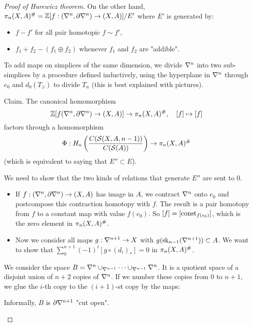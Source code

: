 \begin{proof}[Proof of Hurewicz theorem]
On the other hand, $\pi_n(X,A)^\#={\mathbb Z}[f:(\nabla^n,\partial\nabla^n)\to(X,A)]/E'$
where $E'$ is generated by:
\begin{itemize}[label={-}]
    \item $f-f'$ for all pair homotopic $f\sim f'$,
    \item $f_1+f_2-(f_1\oplus f_2)$ whenever $f_1$ and $f_2$ are "addible".
\end{itemize}

To add maps on simplices of the same dimension, we divide $\nabla^n$ into two sub-simplices by a procedure defined inductively, using the hyperplane in $\nabla^n$ through $e_0$ and $d_0(T_\ni)$ to divide $T_n$ (this is best explained with pictures).\alvaropls

Claim. The canonical homomorphism
\[{\mathbb Z}[f(\nabla^n,\partial\nabla^n)\to(X,A)]\to \pi_n(X,A)^\#,\quad [f]\mapsto[f]\]
factors through a homomorphism
\[\Phi: H_n\left(\frac{C(\mathcal{S}(X,A,n-1))}{C(\mathcal{S}(A))}\right)\to\pi_n(X,A)^\#\]
(which is equivalent to saying that $E''\subset E$).

\begin{claimproof}
We need to show that the two kinds of relations that generate $E''$ are sent to $0$.
\begin{itemize}[label={-}]
    \item If $f:(\nabla^n,\partial\nabla^n)\to(X,A)$ has image in $A$, we contract $\nabla^n$ onto $e_0$ and postcompose this contraction homotopy with $f$. The result is a pair homotopy from $f$ to a constant map with value $f(e_0)$. So $[f]=[\operatorname{const}_{f(e_0)}]$, which is the zero element in $\pi_n(X,A)^\#$.
    \item Now we consider all maps $g:\nabla^{n+1}\to X$ with $g(\operatorname{sk}_{n-1}(\nabla^{n+1}))\subset A$. We want to show that $\sum_0^{n+1}(-1)^i [g\circ(d_i)_*]=0$ in $\pi_n(X,A)^\#$.
\end{itemize}

We consider the space $B=\nabla^{n}\cup_{\nabla^{n-1}}\dots\cup_{\nabla^{n-1}}\nabla^{n}$. It is a quotient space of a disjoint union of $n+2$ copies of $\nabla^n$. If we number these copies from $0$ to $n+1$, we glue the $i$-th copy to the $(i+1)$-st copy by the maps:
\begin{center}
\end{center}

Informally, $B$ is $\partial\nabla^{n+1}$ "cut open".\alvaropls


\end{claimproof}
\end{proof}
